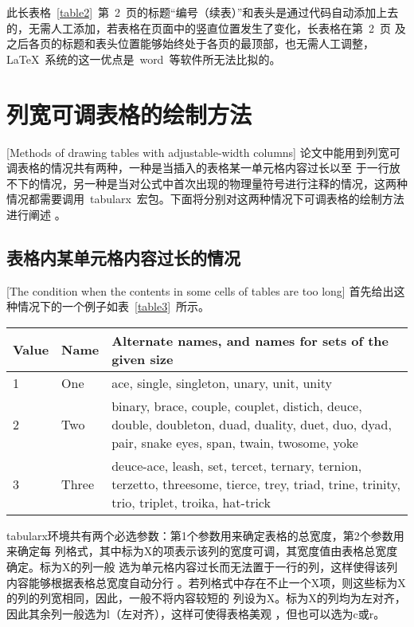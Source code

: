 此长表格~\ref{table2}~第~2~页的标题“编号（续表）”和表头是通过代码自动添加上去的，无需人工添加，若表格在页面中的竖直位置发生了变化，长表格在第~2~页
及之后各页的标题和表头位置能够始终处于各页的最顶部，也无需人工调整，\LaTeX~系统的这一优点是~word~等软件所无法比拟的。

\section{列宽可调表格的绘制方法}[Methods of drawing tables with adjustable-width columns]
论文中能用到列宽可调表格的情况共有两种，一种是当插入的表格某一单元格内容过长以至
于一行放不下的情况，另一种是当对公式中首次出现的物理量符号进行注释的情况，这两种
情况都需要调用~tabularx~宏包。下面将分别对这两种情况下可调表格的绘制方法进行阐述
。
\subsection{表格内某单元格内容过长的情况}[The condition when the contents in
	some cells of tables are too long]
首先给出这种情况下的一个例子如表~\ref{table3}~所示。
\begin{table}[htbp]
	\centering
	\vspace{0.5em}\wuhao
	\begin{tabularx}{0.7\textwidth}{llX}
		\toprule[1.5pt]
		Value & Name  & Alternate names, and names for sets of the given size                                                                                           \\\midrule[1pt]
		1     & One   & ace, single, singleton, unary, unit, unity                                                                                                      \\
		2     & Two   & binary, brace, couple, couplet, distich, deuce, double, doubleton, duad, duality, duet, duo, dyad, pair, snake eyes, span, twain, twosome, yoke \\
		3     & Three & deuce-ace, leash, set, tercet, ternary, ternion, terzetto, threesome, tierce, trey, triad, trine, trinity, trio, triplet, troika, hat-trick     \\\bottomrule[1.5pt]
	\end{tabularx}
\end{table}
tabularx环境共有两个必选参数：第1个参数用来确定表格的总宽度，第2个参数用来确定每
列格式，其中标为X的项表示该列的宽度可调，其宽度值由表格总宽度确定。标为X的列一般
选为单元格内容过长而无法置于一行的列，这样使得该列内容能够根据表格总宽度自动分行
。若列格式中存在不止一个X项，则这些标为X的列的列宽相同，因此，一般不将内容较短的
列设为X。标为X的列均为左对齐，因此其余列一般选为l（左对齐），这样可使得表格美观
，但也可以选为c或r。

